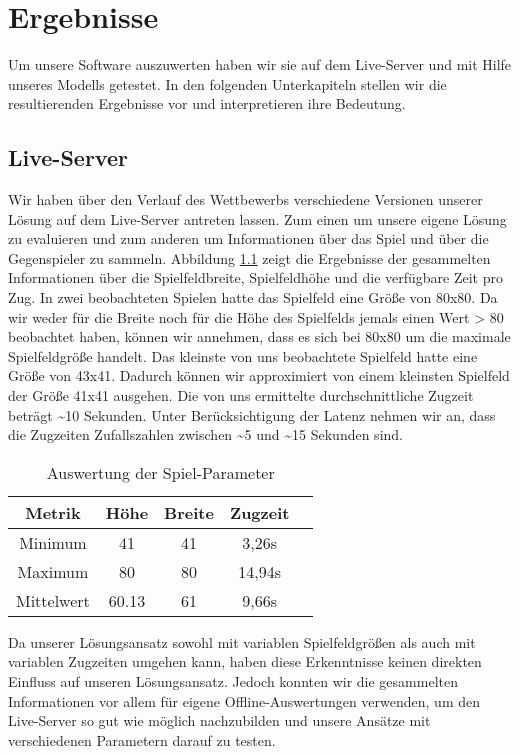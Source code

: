 \chapter{Ergebnisse}
\label{cha:Ergebnisse}

Um unsere Software auszuwerten haben wir sie auf dem Live-Server und mit Hilfe unseres Modells getestet. In den folgenden Unterkapiteln stellen wir die resultierenden Ergebnisse vor und interpretieren ihre Bedeutung.

\section{Live-Server}

Wir haben über den Verlauf des Wettbewerbs verschiedene Versionen unserer Lösung auf dem Live-Server antreten lassen. Zum einen um unsere eigene Lösung zu evaluieren und zum anderen um Informationen über das Spiel und über die Gegenspieler zu sammeln. Abbildung \ref{tab:Spiel_Parameter} zeigt die Ergebnisse der gesammelten Informationen über die Spielfeldbreite, Spielfeldhöhe und die verfügbare Zeit pro Zug. In zwei beobachteten Spielen hatte das Spielfeld eine Größe von 80x80. Da wir weder für die Breite noch für die Höhe des Spielfelds jemals einen Wert > 80 beobachtet haben, können wir annehmen, dass es sich bei 80x80 um die maximale Spielfeldgröße handelt. Das kleinste von uns beobachtete Spielfeld hatte eine Größe von 43x41. Dadurch können wir approximiert von einem kleinsten Spielfeld der Größe 41x41 ausgehen. Die von uns ermittelte durchschnittliche Zugzeit beträgt \textasciitilde10 Sekunden. Unter Berücksichtigung der Latenz nehmen wir an, dass die Zugzeiten Zufallszahlen zwischen \textasciitilde5 und \textasciitilde15 Sekunden sind.

\begin{table}[t]
	\begin{tabular}{|c|c|c|c|c|}
		\hline 
		Metrik & Höhe & Breite & Zugzeit \\
		\hline\hline
		Minimum & 41 & 41 & 3,26s \\
		\hline 
		Maximum & 80 & 80 & 14,94s \\
		\hline 
		Mittelwert & 60.13 & 61 & 9,66s \\
		\hline
	\end{tabular}
	\centering
	\caption[Auswertung der Spiel-Parameter]{Auswertung der Spiel-Parameter}
	\label{tab:Spiel_Parameter}
\end{table}

Da unserer Lösungsansatz sowohl mit variablen Spielfeldgrößen als auch mit variablen Zugzeiten umgehen kann, haben diese Erkenntnisse keinen direkten Einfluss auf unseren Lösungsansatz. Jedoch konnten wir die gesammelten Informationen vor allem für eigene Offline-Auswertungen verwenden, um den Live-Server so gut wie möglich nachzubilden und unsere Ansätze mit verschiedenen Parametern darauf zu testen.

